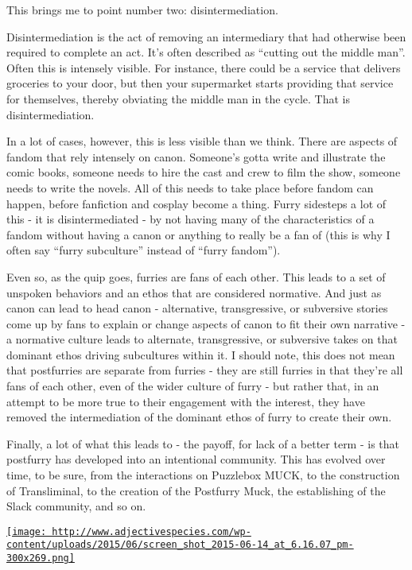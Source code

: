 This brings me to point number two: disintermediation.

Disintermediation is the act of removing an intermediary that had
otherwise been required to complete an act. It's often described as
``cutting out the middle man''. Often this is intensely visible. For
instance, there could be a service that delivers groceries to your door,
but then your supermarket starts providing that service for themselves,
thereby obviating the middle man in the cycle. That is
disintermediation.

In a lot of cases, however, this is less visible than we think. There
are aspects of fandom that rely intensely on canon. Someone's gotta
write and illustrate the comic books, someone needs to hire the cast and
crew to film the show, someone needs to write the novels. All of this
needs to take place before fandom can happen, before fanfiction and
cosplay become a thing. Furry sidesteps a lot of this - it is
disintermediated - by not having many of the characteristics of a fandom
without having a canon or anything to really be a fan of (this is why I
often say ``furry subculture'' instead of ``furry fandom'').

Even so, as the quip goes, furries are fans of each other. This leads to
a set of unspoken behaviors and an ethos that are considered normative.
And just as canon can lead to head canon - alternative, transgressive,
or subversive stories come up by fans to explain or change aspects of
canon to fit their own narrative - a normative culture leads to
alternate, transgressive, or subversive takes on that dominant ethos
driving subcultures within it. I should note, this does not mean that
postfurries are separate from furries - they are still furries in that
they're all fans of each other, even of the wider culture of furry - but
rather that, in an attempt to be more true to their engagement with the
interest, they have removed the intermediation of the dominant ethos of
furry to create their own.

Finally, a lot of what this leads to - the payoff, for lack of a better
term - is that postfurry has developed into an intentional community.
This has evolved over time, to be sure, from the interactions on
Puzzlebox MUCK, to the construction of Transliminal, to the creation of
the Postfurry Muck, the establishing of the Slack community, and so on.

\href{http://www.adjectivespecies.com/wp-content/uploads/2015/06/screen_shot_2015-06-14_at_6.16.07_pm.png}{\texttt{[image: http://www.adjectivespecies.com/wp-content/uploads/2015/06/screen\_shot\_2015-06-14\_at\_6.16.07\_pm-300x269.png]}}

